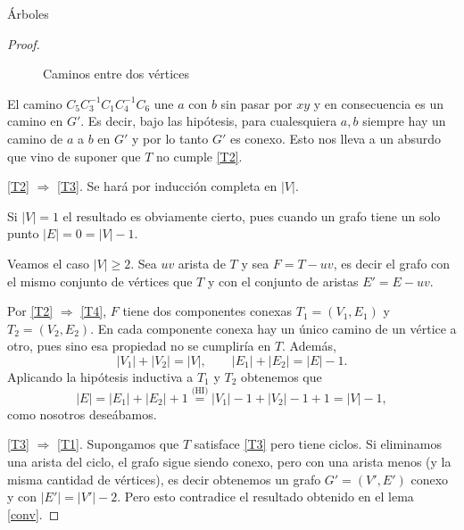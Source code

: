 \begin{section}{Árboles}
\begin{proof}
\begin{figure}[ht]
    \begin{center}
    \end{center}
    \caption{Caminos entre dos vértices} \label{fT2T3}
\end{figure}


El camino $C_5C_3^{-1}C_1C_4^{-1}C_6$ une $a$ con $b$ sin pasar por $xy$ y en consecuencia es un camino en $G'$. Es decir, bajo las hipótesis,  para cualesquiera $a,b$ siempre hay un camino de $a$ a $b$ en $G'$ y por lo tanto  $G'$ es conexo. Esto nos lleva a un absurdo que vino de suponer que $T$ no cumple \ref{T2}.




\noindent \ref{T2} $\Rightarrow$ \ref{T3}.  Se hará por inducción completa en $|V|$. 

Si $|V|=1$  el resultado es obviamente cierto, pues cuando un grafo tiene un solo punto $|E| =0 = |V|-1$. 
    
Veamos el caso $|V|\ge 2$. Sea $uv$  arista de $T$ y sea  $F = T -uv$,  es decir el grafo con el mismo conjunto de vértices que $T$ y con el conjunto de aristas $E'=E-uv$. 

Por  \ref{T2} $\Rightarrow$ \ref{T4}, $F$ tiene dos componentes conexas   $T_1 = (V_1, E_1)$ y  $T_2 = (V_2, E_2)$. En cada componente conexa  hay un único camino de un vértice a otro, pues sino esa propiedad no se cumpliría en $T$. Además, 
$$
|V_1| + |V_2| = |V|, \qquad |E_1| + |E_2| = |E|-1.
$$
Aplicando la hipótesis inductiva a $T_1$ y $T_2$ obtenemos que
$$
|E|=|E_1| + |E_2| + 1 \stackrel{\text{(HI)}}{=} |V_1|-1 +|V_2|-1+1= |V| -1,
$$
como nosotros deseábamos. 

\noindent \ref{T3} $\Rightarrow$ \ref{T1}. Supongamos que $T$ satisface \ref{T3} pero tiene ciclos. Si eliminamos una arista del ciclo, el grafo sigue siendo conexo, pero con una arista menos (y la misma cantidad de vértices), es decir obtenemos un grafo $G' = (V',E')$  conexo y con $|E'| = |V'|-2$. Pero esto contradice el resultado obtenido en el lema \ref{conv}.    


\end{proof}
\end{section}
